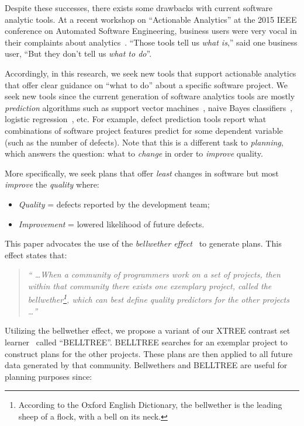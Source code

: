 \documentclass[10pt,journal,compsoc]{IEEEtran}
\newcommand{\bi}{\begin{itemize}} %
\newcommand{\ei}{\end{itemize}}
\begin{document}
	Despite these successes, there exists  some drawbacks with current
	software analytic tools. At a recent workshop on ``Actionable Analytics'' at the 2015 IEEE conference on
	Automated Software Engineering,
	business users were very vocal in their complaints about analytics~\cite{hihn15}.
	``Those tools tell us \textit{what is},'' said one business user, ``But they don't tell us \textit{what to do}''.
	
	Accordingly, in this research, we seek new tools that support actionable analytics that offer  clear guidance on ``what to do'' about a specific software project. We seek new tools since the current generation of software analytics tools are mostly \textit{prediction} algorithms such as support vector machines~\cite{cortes95}, naive Bayes classifiers~\cite{lessmann08}, logistic regression~\cite{lessmann08}, etc. For example, defect prediction tools report what combinations of software project features predict for some dependent variable (such as the number of defects). Note that this is a different task to \textit{planning}, which answers the question: what to {\em change} in order to {\em improve} quality.
		
	More specifically, we seek  plans that offer {\em least} changes in software but most \textit{improve} the \textit{quality} where:
	\bi
	\item \textit{Quality} = defects reported by the development team; 
	\item \textit{Improvement} = lowered likelihood of future defects.
	\ei

	This paper advocates the use of the {\em bellwether effect}~\cite{krishna16} to generate plans. This effect states that:
    \begin{quote}
        \textit{`` \ldots When a community of programmers work on a set of projects, then within that community there exists one exemplary project, called the bellwether\footnote{According to the Oxford English Dictionary, the bellwether is the leading sheep of a flock, with a bell on its neck.}, which can best define quality predictors for the other projects \ldots ''}
    \end{quote}
   
    Utilizing  the bellwether effect, we propose a variant of our XTREE contrast set learner~\cite{krishna17a}  called ``BELLTREE''.  
    BELLTREE   searches for an exemplar project to construct plans for the other projects. These plans are then applied to all future data generated by that community. Bellwethers and BELLTREE are useful for planning purposes since:
    
\end{document}
